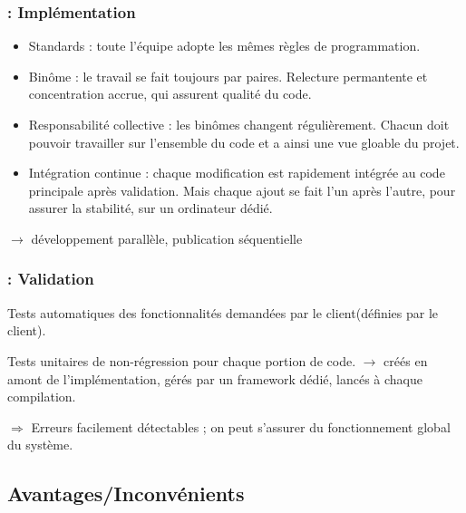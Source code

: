 \begin{frame}
\frametitle{\insertsubsection : Implémentation}
\begin{itemize}
\item Standards : toute l'équipe adopte les mêmes règles de programmation.
\item Binôme : le travail se fait toujours par paires. Relecture permantente et concentration accrue, qui assurent qualité du code.
\item Responsabilité collective : les binômes changent régulièrement. Chacun doit pouvoir travailler sur l'ensemble du code et a ainsi une vue gloable du projet.
\item Intégration continue : chaque modification est rapidement intégrée au code principale après validation. Mais chaque ajout se fait l'un après l'autre, pour assurer la stabilité, sur un ordinateur dédié.
\end{itemize}

\begin{center}
$\longrightarrow$  développement parallèle, publication séquentielle 
\end{center}
\end{frame}

\begin{frame}
\frametitle{\insertsubsection : Validation}
\item Tests automatiques des fonctionnalités demandées par le client(définies par le client).
\item Tests unitaires de non-régression pour chaque portion de code.
$\longrightarrow$ créés en amont de l'implémentation, gérés par un framework dédié, lancés à chaque compilation.
\item $\Rightarrow$ Erreurs facilement détectables ; on peut s'assurer du fonctionnement global du système.

\end{frame}

\subsection{Avantages/Inconvénients}
\begin{frame}
\frametitle{\insertsubsection}
\end{frame}
